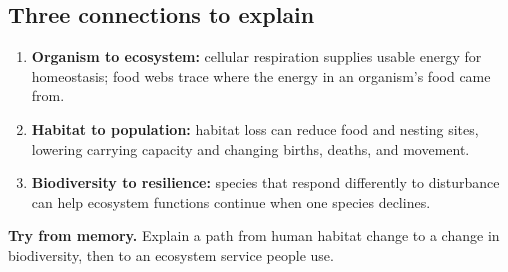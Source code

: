 \documentclass[11pt,letterpaper]{article}
\newcommand{\memorycheck}[1]{\par\smallskip\textbf{Try from memory.} #1\par}
\begin{document}
\subsection*{Three connections to explain}
\begin{enumerate}
\item \textbf{Organism to ecosystem:} cellular respiration supplies usable energy for homeostasis; food webs trace where the energy in an organism's food came from.
\item \textbf{Habitat to population:} habitat loss can reduce food and nesting sites, lowering carrying capacity and changing births, deaths, and movement.
\item \textbf{Biodiversity to resilience:} species that respond differently to disturbance can help ecosystem functions continue when one species declines.
\end{enumerate}
\memorycheck{Explain a path from human habitat change to a change in biodiversity, then to an ecosystem service people use.}
\end{document}
